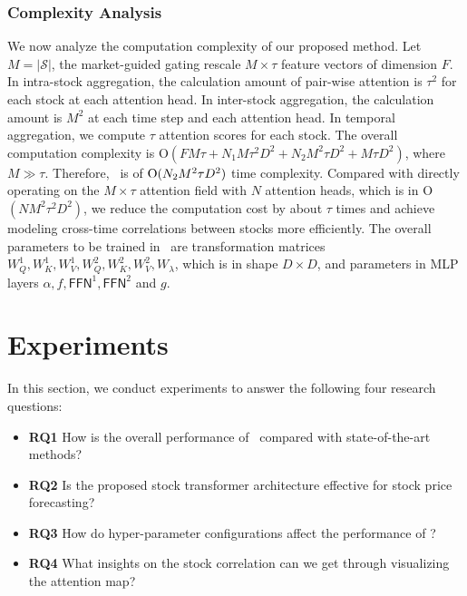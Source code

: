 \subsubsection{Complexity Analysis}
We now analyze the computation complexity of our proposed method.
Let $M=|\mathcal{S}|$, the market-guided gating rescale $M \times \tau$ feature vectors of dimension $F$.
In intra-stock aggregation, the calculation amount of pair-wise attention is $\tau^2$ for each stock at each attention head.
In inter-stock aggregation, the calculation amount is $M^2$ at each time step and each attention head.
In temporal aggregation, we compute $\tau$ attention scores for each stock. 
The overall computation complexity is {\rm O}$(FM\tau+N_1M\tau^2D^2+N_2M^2\tau D^2+M\tau D^2)$, where $M\gg \tau$.
Therefore, \frameworkname~is of ${\rm O}(N_2M^2\tau D^2)$ time complexity.
Compared with directly operating on the $M \times \tau$ attention field with $N$ attention heads, which is in {\rm O}$(NM^2\tau^2D^2)$, we reduce the computation cost by about $\tau$ times and achieve modeling cross-time correlations between stocks more efficiently.
The overall parameters to be trained in \frameworkname~are transformation matrices $W^1_Q, W^1_K, W^1_V, W^2_Q, W^2_K, W^2_V, W_\lambda$, which is in shape $D\times D$, and parameters in MLP layers $\alpha, f, \textsf{FFN}^1, \textsf{FFN}^2$ and $g$.

\section{Experiments}
In this section, we conduct experiments to answer the following four research questions:
\begin{itemize}
    \item \textbf{RQ1} How is the overall performance of \frameworkname~compared with state-of-the-art methods?
    \item \textbf{RQ2} Is the proposed stock transformer architecture effective for stock price forecasting?
    \item \textbf{RQ3} How do hyper-parameter configurations affect the performance of \frameworkname?
    \item \textbf{RQ4} What insights on the stock correlation can we get through visualizing the attention map?
\end{itemize}


